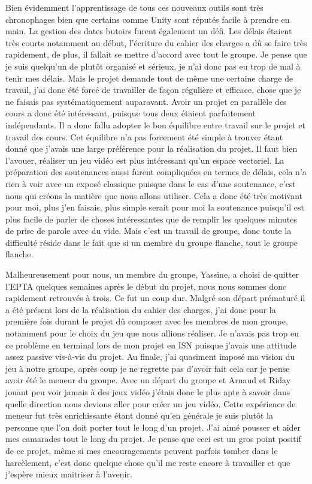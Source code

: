 \documentclass[a4paper, 12pt]{article}
\begin{document}
	\medbreak
\par Bien évidemment l’apprentissage de tous ces nouveaux outils sont très chronophages bien que certains comme Unity sont réputés facile à prendre en main. La gestion des dates butoirs furent également un défi. Les délais étaient très courts notamment au début, l’écriture du cahier des charges a dû se faire très rapidement, de plus, il fallait se mettre d’accord avec tout le groupe. Je pense que je suis quelqu’un de plutôt organis\'e et sérieux, je n’ai donc pas eu trop de mal à tenir mes délais. Mais le projet demande tout de même une certaine charge de travail, j’ai donc été forcé de travailler de façon régulière et efficace, chose que je ne faisais pas systématiquement auparavant. Avoir un projet en parallèle des cours a donc été intéressant, puisque tous deux étaient parfaitement indépendants. Il a donc fallu adopter le bon équilibre entre travail sur le projet et travail des cours. Cet équilibre n’a pas forcement été simple à trouver étant donné que j’avais une large préférence pour la réalisation du projet. Il faut bien l’avouer, réaliser un jeu vidéo est plus intéressant qu’un espace vectoriel. La préparation des soutenances aussi furent compliquées en termes de délais, cela n’a rien à voir avec un exposé classique puisque dans le cas d’une soutenance, c’est nous qui créons la matière que nous allons utiliser. Cela a donc été très motivant pour moi, plus j’en faisais, plus simple serait pour moi la soutenance puisqu’il est plus facile de parler de choses intéressantes que de remplir les quelques minutes de prise de parole avec du vide. Mais c’est un travail de groupe, donc toute la difficulté réside dans le fait que si un membre du groupe flanche, tout le groupe flanche.
	\medbreak
\par Malheureusement pour nous, un membre du groupe, Yassine, a choisi de quitter l’EPTA quelques semaines après le début du projet, nous nous sommes donc rapidement retrouvés à trois. Ce fut un coup dur. Malgré son départ prématuré il a été présent lors de la réalisation du cahier des charges, j’ai donc pour la première fois durant le projet d\^u composer avec les membres de mon groupe, notamment pour le choix du jeu que nous allions réaliser. Je n’avais pas trop eu ce problème en terminal lors de mon projet en ISN puisque j’avais une attitude assez passive vis-à-vis du projet. Au finale, j’ai quasiment imposé ma vision du jeu à notre groupe, après coup je ne regrette pas d’avoir fait cela car je pense avoir été le meneur du groupe. Avec un départ du groupe et Arnaud et Riday jouant peu voir jamais à des jeux vidéo j’étais donc le plus apte à savoir dans quelle direction nous devions aller pour créer un jeu vidéo. Cette expérience de meneur fut très enrichissante étant donné qu’en générale je suis plutôt la personne que l’on doit porter tout le long d’un projet. J’ai aimé pousser et aider mes camarades tout le long du projet. Je pense que ceci est un gros point positif de ce projet, même si mes encouragements peuvent parfois tomber dans le harcèlement, c’est donc quelque chose qu’il me reste encore à travailler et que j’espère mieux maitriser à l’avenir.
\end{document}
